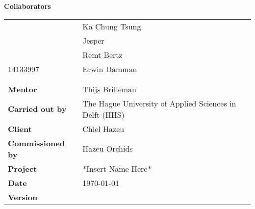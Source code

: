 \begin{titlepage}
		
	\begin{center}
		\LARGE{\textbf{\thistitle}}
	\end{center}
	
	\begin{figure}[h]
	\end{figure}
	
	\bigskip
	\textbf{Collaborators}
	\begin{table}[h]
		\begin{tabular}{@{}ll@{}}
			                 & Ka Chung Tsung                                          \\
			                 & Jesper                                           \\
			                 & Remt Bertz                                        \\
			14133997                 & Erwin Damman                                            \\
			                         &              										   \\
			                         &              										   \\
			\textbf{Mentor}          & Thijs Brilleman                                         \\
			\textbf{Carried out by}  & The Hague University of Applied Sciences in Delft (HHS) \\
			\textbf{Client}          & Chiel Hazeu                                             \\
			\textbf{Commissioned by} & Hazeu Orchids                                           \\
			\textbf{Project}         & *Insert Name Here*                                      \\
			\textbf{Date}            & \today                                                  \\
			\textbf{Version}         & \version          									   \\
		\end{tabular}
	\end{table}
\end{titlepage}


